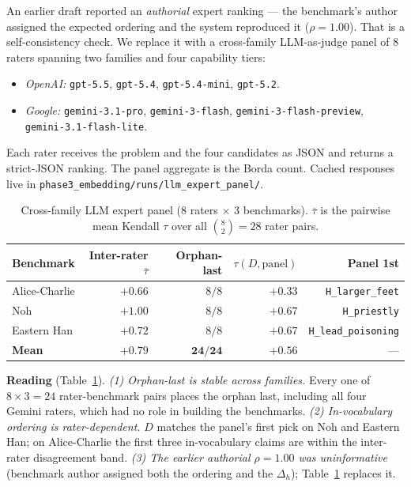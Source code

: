 \documentclass{article}
\begin{document}
An earlier draft reported an \emph{authorial} expert ranking --- the
benchmark's author assigned the expected ordering and the system
reproduced it ($\rho = 1.00$). That is a self-consistency check.
We replace it with a cross-family LLM-as-judge panel of $8$ raters
spanning two families and four capability tiers:
\begin{itemize}[leftmargin=*, itemsep=0pt]
\item \emph{OpenAI:} \texttt{gpt-5.5}, \texttt{gpt-5.4},
  \texttt{gpt-5.4-mini}, \texttt{gpt-5.2}.
\item \emph{Google:} \texttt{gemini-3.1-pro},
  \texttt{gemini-3-flash}, \texttt{gemini-3-flash-preview},
  \texttt{gemini-3.1-flash-lite}.
\end{itemize}
Each rater receives the problem and the four candidates as JSON
and returns a strict-JSON ranking. The panel aggregate is the Borda
count. Cached responses live in
\texttt{phase3\_embedding/runs/llm\_expert\_panel/}.

\begin{table}[h]
\centering
\caption{Cross-family LLM expert panel (8 raters $\times$ 3 benchmarks).
$\overline{\tau}$ is the pairwise mean Kendall $\tau$ over all
$\binom{8}{2} = 28$ rater pairs.}
\label{tab:llm-panel}
\begin{tabular}{lrrrr}
\toprule
Benchmark & Inter-rater $\overline{\tau}$ & Orphan-last & $\tau(D, \text{panel})$ & Panel 1st \\
\midrule
Alice-Charlie & $+0.66$ & $8/8$ & $+0.33$ & \texttt{H\_larger\_feet} \\
Noh           & $+1.00$ & $8/8$ & $+0.67$ & \texttt{H\_priestly} \\
Eastern Han   & $+0.72$ & $8/8$ & $+0.67$ & \texttt{H\_lead\_poisoning} \\
\midrule
\textbf{Mean} & $\mathbf{+0.79}$ & $\mathbf{24/24}$ & $\mathbf{+0.56}$ & --- \\
\bottomrule
\end{tabular}
\end{table}

\textbf{Reading} (Table~\ref{tab:llm-panel}).
\emph{(1) Orphan-last is stable across families.} Every one of
$8 \times 3 = 24$ rater-benchmark pairs places the orphan last,
including all four Gemini raters, which had no role in building the
benchmarks. \emph{(2) In-vocabulary ordering is rater-dependent.}
$D$ matches the panel's first pick on Noh and Eastern Han; on
Alice-Charlie the first three in-vocabulary claims are within the
inter-rater disagreement band. \emph{(3) The earlier authorial
$\rho = 1.00$ was uninformative} (benchmark author assigned both the
ordering and the $\Delta_{h}$); Table~\ref{tab:llm-panel} replaces it.
\end{document}
